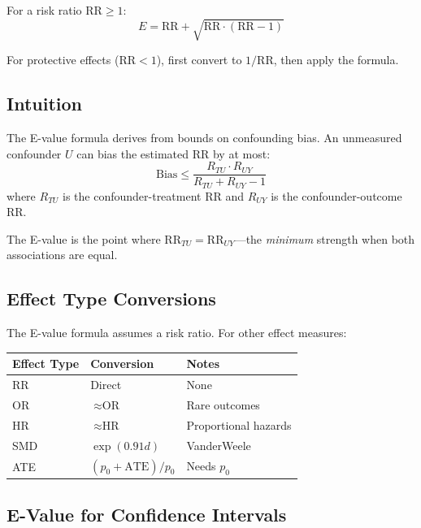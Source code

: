 For a risk ratio $\text{RR} \geq 1$:
\begin{equation}
\label{eq:e_value}
\boxed{E = \text{RR} + \sqrt{\text{RR} \cdot (\text{RR} - 1)}}
\end{equation}

For protective effects ($\text{RR} < 1$), first convert to $1/\text{RR}$, then apply the formula.

\subsection{Intuition}

The E-value formula derives from bounds on confounding bias. An unmeasured confounder $U$ can bias the estimated RR by at most:
\begin{equation}
\text{Bias} \leq \frac{R_{TU} \cdot R_{UY}}{R_{TU} + R_{UY} - 1}
\end{equation}
where $R_{TU}$ is the confounder-treatment RR and $R_{UY}$ is the confounder-outcome RR.

The E-value is the point where $\text{RR}_{TU} = \text{RR}_{UY}$---the \emph{minimum} strength when both associations are equal.

\subsection{Effect Type Conversions}

The E-value formula assumes a risk ratio. For other effect measures:

\begin{center}
\begin{tabular}{lll}
\toprule
Effect Type & Conversion & Notes \\
\midrule
RR & Direct & None \\
OR & $\approx \text{OR}$ & Rare outcomes \\
HR & $\approx \text{HR}$ & Proportional hazards \\
SMD & $\exp(0.91 d)$ & VanderWeele \\
ATE & $(p_0 + \text{ATE})/p_0$ & Needs $p_0$ \\
\bottomrule
\end{tabular}
\end{center}

\subsection{E-Value for Confidence Intervals}

